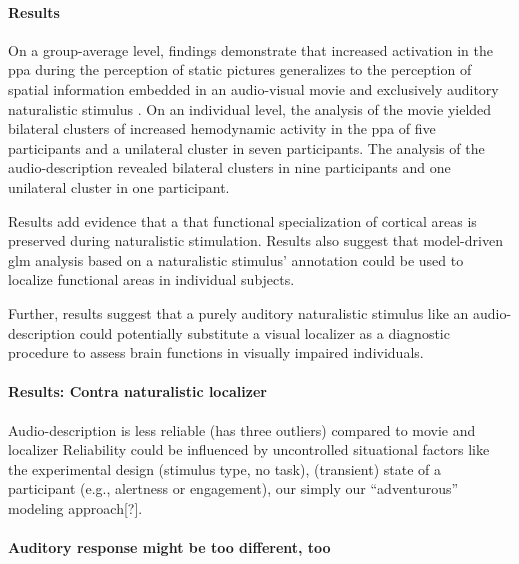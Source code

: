 \paragraph{Results}


On a group-average level, findings demonstrate that increased activation in the
\ac{ppa} during the perception of static pictures generalizes to the perception
of spatial information embedded in an audio-visual movie and exclusively
auditory naturalistic stimulus \citep{haeusler2022processing}.
On an individual level, the analysis of the movie yielded bilateral
clusters of increased hemodynamic activity in the \ac{ppa} of five participants
and a unilateral cluster in seven participants.
%
The analysis of the audio-description revealed bilateral clusters in nine
participants and one unilateral cluster in one participant.

Results add evidence \citep[cf.][]{bartels2004mapping} that a that functional
specialization of cortical areas is preserved during naturalistic stimulation.
%
Results also suggest that model-driven \ac{glm} analysis based on a naturalistic
stimulus' annotation could be used to localize functional areas in individual
subjects.

Further, results suggest that a purely auditory naturalistic stimulus like an
audio-description could potentially substitute a visual localizer as a
diagnostic procedure to assess brain functions in visually impaired individuals.




\paragraph{Results: Contra naturalistic localizer}



Audio-description is less reliable (has three outliers) compared to movie and
localizer
%
Reliability could be influenced by uncontrolled situational factors like the
experimental design (stimulus type, no task), (transient) state of a participant
(e.g., alertness or engagement),  our simply our ``adventurous'' modeling
approach[?].


\paragraph{Auditory response might be too different, too}


